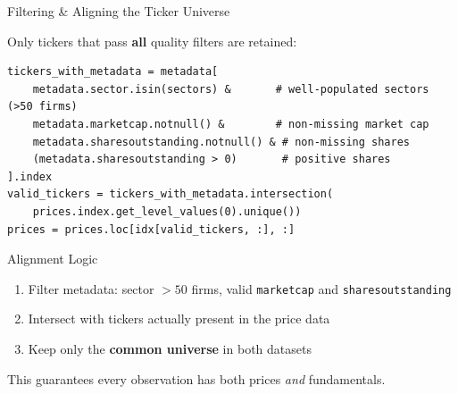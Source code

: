\documentclass[aspectratio=169]{beamer}
\begin{document}
\begin{frame}[fragile]{Filtering \& Aligning the Ticker Universe}

Only tickers that pass \textbf{all} quality filters are retained:
\footnotesize
\begin{lstlisting}
tickers_with_metadata = metadata[
    metadata.sector.isin(sectors) &       # well-populated sectors (>50 firms)
    metadata.marketcap.notnull() &        # non-missing market cap
    metadata.sharesoutstanding.notnull() & # non-missing shares
    (metadata.sharesoutstanding > 0)       # positive shares
].index
valid_tickers = tickers_with_metadata.intersection(
    prices.index.get_level_values(0).unique())
prices = prices.loc[idx[valid_tickers, :], :]
\end{lstlisting}
\small
\vspace{-.3cm}
\begin{block}{Alignment Logic}
\begin{enumerate}
  \item Filter metadata: sector $> 50$ firms, valid \texttt{marketcap} and \texttt{sharesoutstanding}
  \item Intersect with tickers actually present in the price data
  \item Keep only the \textbf{common universe} in both datasets
\end{enumerate}
This guarantees every observation has both prices \emph{and} fundamentals.
\end{block}

\end{frame}
%
%
\end{document}
